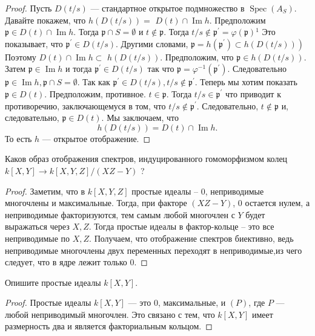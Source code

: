 \begin{proof}
Пусть $D(t / s)$ — стандартное открытое подмножество в $\operatorname{Spec}\left(A_S\right)$. Давайте покажем, что $h(D(t / s))=$ $D(t) \cap \operatorname{Im} h$. Предположим $\mathfrak{p} \in D(t) \cap \operatorname{Im} h$. Тогда $\mathfrak{p} \cap S=\emptyset$ и $t \notin \mathfrak{p}$. Тогда $t / s \notin \mathfrak{p}^{\prime}=\varphi(\mathfrak{p}){ }^1$ Это показывает, что $\mathfrak{p}^{\prime} \in D(t / s)$. Другими словами, $\left.\mathfrak{p}=h\left(\mathfrak{p}^{\prime}\right) \subset h(D(t / s))\right)$ Поэтому $D(t) \cap \operatorname{Im} h \subset$ $h(D(t / s))$. Предположим, что $\mathfrak{p} \in h(D(t / s))$. Затем $\mathfrak{p} \in \operatorname{Im} h$ и тогда $\mathfrak{p}^{\prime} \in D(t / s)$ так что $\mathfrak{p}=\varphi^{-1}\left(\mathfrak{p}^{\prime}\right)$. Следовательно $\mathfrak{p} \in \operatorname{Im} h, \mathfrak{p} \cap S=\emptyset$. Так как $\mathfrak{p}^{\prime} \in D(t / s), t / s \notin \mathfrak{p}^{\prime}$. Теперь мы хотим показать $\mathfrak{p} \in D(t)$. Предположим, противное. $t \in \mathfrak{p}$. Тогда $t / s \in \mathfrak{p}^{\prime}$ что приводит к противоречию, заключающемуся в том, что $t / s \notin \mathfrak{p}^{\prime}$. Следовательно, $t \notin \mathfrak{p}$ и, следовательно, $\mathfrak{p} \in D(t)$. Мы заключаем, что
$$
h(D(t / s))=D(t) \cap \operatorname{Im} h .
$$
То есть $h$ — открытое отображение.
\end{proof}
\vskip 0.6in


\newpage

\begin{prob}
Каков образ отображения спектров, индуцированного гомоморфизмом колец $k[X, Y] \rightarrow k[X, Y, Z] /(X Z-Y)$ ?
\end{prob}

\begin{proof}
Заметим, что в $k[X, Y, Z]$ простые идеалы -- 0, неприводимые многочлены и максимальные. Тогда, при факторе $(X Z-Y)$, 0 остается нулем, а неприводимые факторизуются, тем самым любой многочлен с $Y$ будет выражаться через $X, Z$. Тогда простые идеалы в фактор-кольце -- это все неприводимые по $X, Z$. Получаем, что отображение спектров биективно, ведь неприводимые многочлены двух переменных переходят в неприводимые,из чего следует, что в ядре лежит только $0$.
\end{proof}
\vskip 0.6in




\begin{prob}
Опишите простые идеалы $k[X, Y]$.
\end{prob}

\begin{proof}
Простые идеалы $k[X,Y]$ — это $0$, максимальные, и $(P)$, где $P$ — любой неприводимый многочлен. Это связано с тем, что $k[X,Y]$ имеет размерность два и является факториальным кольцом.
\end{proof}
\begin{comment}
The prime ideals of $k[X,Y]$ are $0$, the maximal ones, and $(P)$ where $P$ is any irreducible polynomial. This is because $k[X,Y]$ has dimension two, and is a UFD.
\end{comment}
